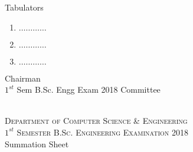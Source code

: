 \documentclass[12pt]{article}
\begin{document}
            \begin{table}[hb]
            	\centering
            \begin{minipage}[b]{0.5\linewidth} %
            {\centering Tabulators }
            \begin{enumerate}
                \item  \hspace*{1ex} $\ldots \ldots \ldots \ldots$  
                \item  \hspace*{1ex} $\ldots \ldots \ldots \ldots$  
                \item  \hspace*{1ex} $\ldots \ldots \ldots \ldots$  
            \end{enumerate} 

            \end{minipage}
            \hspace*{1.2cm}
            \begin{minipage}[b]{0.4\linewidth} \centering
            Chairman  \hspace*{1ex} \\
           $1^{st}$ Sem B.Sc. Engg Exam 2018 Committee
            \end{minipage}
            \end{table}
    \centering
    \begin{minipage}[m]{.8\textwidth} \centering 
	\smallskip
	\\
	\textsc{Department of Computer Science \& Engineering}\\
	\textsc{$1^{st}$ Semester B.Sc. Engineering Examination 2018}\\
	{\large {\sc Summation Sheet}}\\  
    \end{minipage} 
\end{document}
